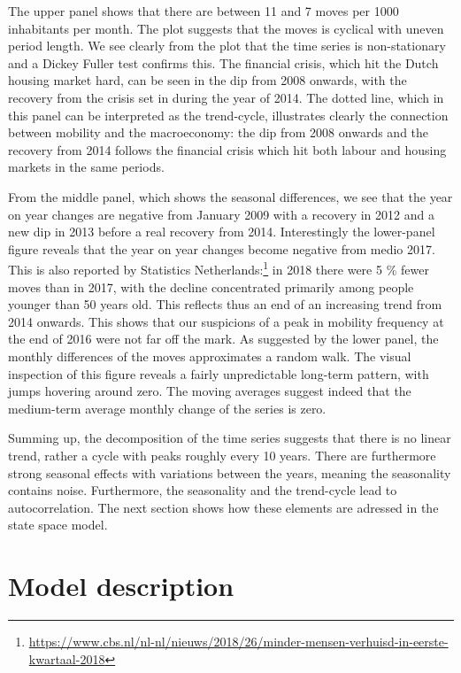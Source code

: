\documentclass[]{article}
\let\rmarkdownfootnote\footnote%
\def\footnote{\protect\rmarkdownfootnote}
\begin{document}
The upper panel shows that there are between 11 and 7 moves per 1000
inhabitants per month. The plot suggests that the moves is cyclical with
uneven period length. We see clearly from the plot that the time series
is non-stationary and a Dickey Fuller test confirms this. The financial
crisis, which hit the Dutch housing market hard, can be seen in the dip
from 2008 onwards, with the recovery from the crisis set in during the
year of 2014. The dotted line, which in this panel can be interpreted as
the trend-cycle, illustrates clearly the connection between mobility and
the macroeconomy: the dip from 2008 onwards and the recovery from 2014
follows the financial crisis which hit both labour and housing markets
in the same periods.

From the middle panel, which shows the seasonal differences, we see that
the year on year changes are negative from January 2009 with a recovery
in 2012 and a new dip in 2013 before a real recovery from 2014.
Interestingly the lower-panel figure reveals that the year on year
changes become negative from medio 2017. This is also reported by
Statistics
Netherlands:\footnote{\url{https://www.cbs.nl/nl-nl/nieuws/2018/26/minder-mensen-verhuisd-in-eerste-kwartaal-2018}}
in 2018 there were 5 \% fewer moves than in 2017, with the decline
concentrated primarily among people younger than 50 years old. This
reflects thus an end of an increasing trend from 2014 onwards. This
shows that our suspicions of a peak in mobility frequency at the end of
2016 were not far off the mark. As suggested by the lower panel, the
monthly differences of the moves approximates a random walk. The visual
inspection of this figure reveals a fairly unpredictable long-term
pattern, with jumps hovering around zero. The moving averages suggest
indeed that the medium-term average monthly change of the series is
zero.

Summing up, the decomposition of the time series suggests that there is
no linear trend, rather a cycle with peaks roughly every 10 years. There
are furthermore strong seasonal effects with variations between the
years, meaning the seasonality contains noise. Furthermore, the
seasonality and the trend-cycle lead to autocorrelation. The next
section shows how these elements are adressed in the state space model.

\section{Model description}\label{model-description}
\end{document}
